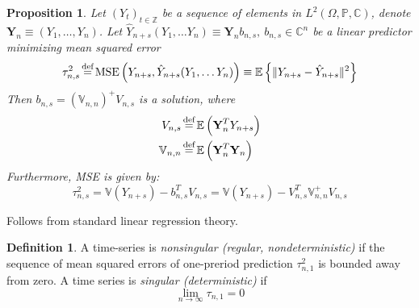 \documentclass[12pt]{article}
\newtheorem{proposition}[theorem]{Proposition}
\theoremstyle{definition}
\newtheorem{definition}[theorem]{Definition}
\theoremstyle{remark}
\numberwithin{equation}{section}
\newcommand{\PP}{\mathbb{P}}
\newcommand{\ZZ}{\mathbb{Z}}
\newcommand{\CC}{\mathbb{C}}
\newcommand{\EE}{\mathbb{E}}
\newcommand{\VV}{\mathbb{V}}
\newcommand{\eq}{\stackrel{\mathclap{\normalfont\text{def}}}{=}}
\begin{document}
\begin{proposition}\label{tsOLS}
Let $(Y_t)_{t\in\ZZ}$ be a sequence of elements in $L^2\left(\Omega, \PP, \CC\right)$, denote $\textbf{Y}_n \equiv (Y_1, \ldots, Y_n)$. Let $\hat Y_{n+s}(Y_1,\ldots Y_n) \equiv \textbf{Y}_n b_{n,s}, \ b_{n,s}\in \CC^n$ be a linear predictor minimizing mean squared error
\begin{equation*}
	\tau_{n,s}^2\eq\text{MSE}\left(Y_{n+s},\hat Y_{n+s}(Y_1,\ldots Y_n)\right)\equiv  \EE\left\{\|Y_{n+s} - \hat Y_{n+s}\|^2\right\}
\end{equation*}
Then $b_{n,s} = (\VV_{n,n})^{+}V_{n, s}$ is a solution, where
\begin{align*}
	V_{n,s} &\eq \EE\left(\textbf{Y}_n^T Y_{n+s}\right)\\ \VV_{n,n} &\eq \EE\left(\textbf{Y}_n^T \textbf{Y}_n\right)
\end{align*}
Furthermore, MSE is given by:
\begin{equation*}
	\tau_{n,s}^2 = \VV(Y_{n+s}) - b_{n,s}^TV_{n,s} = \VV(Y_{n+s}) - V_{n,s}^T \VV_{n,n}^+V_{n,s}
\end{equation*}
\end{proposition}
\proof Follows from standard linear regression theory.

\begin{definition}
	A time-series is \emph{nonsingular (regular, nondeterministic)} if the sequence of mean squared errors of one-preriod prediction $\tau_{n,1}^2$ is bounded away from zero. A time series is \emph{singular (deterministic)} if
	\begin{equation*}
		\lim_{n\rightarrow \infty} \tau_{n,1} = 0
	\end{equation*}
\end{definition}
\end{document}
